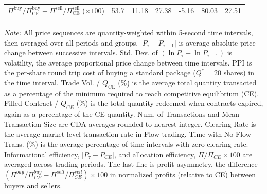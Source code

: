 \documentclass[12pt]{article}
\begin{document}
\begin{table}
\begin{threeparttable}
\begin{tabular}{lcccccc}
     ${\Pi^{\text{buy}}}/{\Pi^{\text{buy}}_{\text{CE}}} - {\Pi^{\text{sell}}}/{\Pi^{\text{sell}}_{\text{CE}}}$ 
     ($\times 100$) & 53.7      & 11.18     & 27.38     & -5.16     & 80.03     & 27.51     \\
     \\[-1.8ex] 
    \bottomrule 
    \end{tabular}
    \begin{tablenotes}
    \footnotesize
    \textit{Note:} All price sequences are quantity-weighted within 5-second time intervals, then averaged over all periods and groups. 
    $|P_{\tau} - P_{\tau-1}|$ is average absolute price change between successive intervals. 
    Std. Dev. of $\left( \ln P_{\tau} - \ln P_{\tau-1} \right)$ is volatility, the average proportional price change between time intervals. 
    PPI is the per-share round trip cost of buying a standard package ($Q^* = 20$ shares) in the time interval.
    Trade Vol. / $Q_{\text{CE}}$ (\%) is the average total quantity transacted as a percentage of the minimum required to reach competitive equilibrium (CE). 
    Filled Contract / $Q_{CE}$ (\%) is the total quantity redeemed when contracts expired, again as a percentage of the CE quantity.
    Num. of Transactions and Mean Transaction Size are CDA averages rounded to nearest integer. 
    Clearing Rate is the average market-level transaction rate in Flow trading. Time with No Flow Trans. (\%) is the average percentage of time intervals with zero clearing rate. 
    Informational efficiency, $|P_{\tau} - P_{CE}|$, and allocation efficiency, $ \Pi/\Pi_{CE} \times 100$ are averaged across trading periods.
    The last line is profit asymmetry, the difference $(\Pi^{buy}/\Pi^{buy}_{CE} - \Pi^{sell}/\Pi^{sell}_{CE}) \times 100$ in normalized  profits (relative to CE) between buyers and sellers. 
    \end{tablenotes}
    \end{threeparttable}
    \label{tab:summary_stat}
\end{table}
\end{document}
